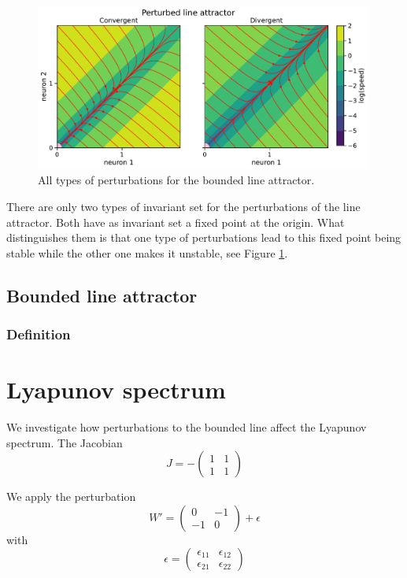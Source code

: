 \documentclass{article}
\theoremstyle{definition}
\theoremstyle{remark}
\begin{document}
\begin{figure}[H]
    \centering
    \includegraphics[width=0.99\textwidth]{figures/lineattractor_pert2.pdf}
    \caption{All types of perturbations for the bounded line attractor.}
    \label{fig:lineattractor_pert2}
\end{figure}

There are only two types of invariant set for the perturbations of the line attractor. Both have as invariant set a fixed point at the origin. What distinguishes them is that one type of perturbations lead to this fixed point being stable while the other one makes it unstable, see Figure \ref{fig:lineattractor_pert2}.

\subsection{Bounded line attractor}
\subsubsection{Definition}

\section{Lyapunov spectrum}
We investigate how perturbations to the bounded line affect the Lyapunov spectrum.
The Jacobian 
\begin{equation}
J = -
\begin{pmatrix}
1  &  1 \\
1  &  1
\end{pmatrix}
\end{equation}

We apply the perturbation
\begin{equation}
W' = 
\begin{pmatrix}
0  &  -1 \\
-1  &  0
\end{pmatrix}
+ \epsilon
\end{equation}
with 
\begin{equation}
\epsilon = 
\begin{pmatrix}
\epsilon_{11}  &  \epsilon_{12} \\
\epsilon_{21}  &  \epsilon_{22}
\end{pmatrix}
\end{equation}
\end{document}
